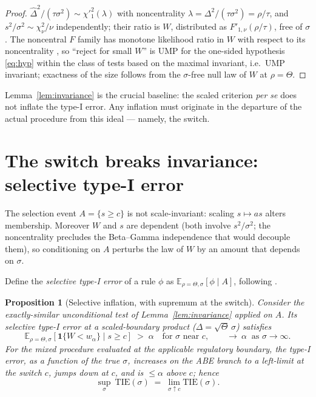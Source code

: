 \documentclass[11pt]{article}
\newtheorem{proposition}{Proposition}
\theoremstyle{remark}
\newcommand{\Dhat}{\hat{\Delta}}
\newcommand{\E}{\mathbb{E}}
\newcommand{\ind}{\mathbf{1}}
\begin{document}
\begin{proof}
$\Dhat^2/(\tau\sigma^2)\sim\chi'^2_1(\lambda)$ with noncentrality $\lambda=\Delta^2/(\tau\sigma^2)=\rho/\tau$, and $s^2/\sigma^2\sim\chi^2_\nu/\nu$ independently; their ratio is $W$, distributed as $F'_{1,\nu}(\rho/\tau)$, free of $\sigma$. The noncentral $F$ family has monotone likelihood ratio in $W$ with respect to its noncentrality \citep[Ch.~3]{lehmann2005}, so ``reject for small $W$'' is UMP for the one-sided hypothesis \eqref{eq:hyp} within the class of tests based on the maximal invariant, i.e.\ UMP invariant; exactness of the size follows from the $\sigma$-free null law of $W$ at $\rho=\Theta$.
\end{proof}

Lemma~\ref{lem:invariance} is the crucial baseline: the scaled criterion \emph{per se} does not inflate the type-I error. Any inflation must originate in the departure of the actual procedure from this ideal --- namely, the switch.

\section{The switch breaks invariance: selective type-I error}\label{sec:selective}

The selection event $A=\{s\ge c\}$ is not scale-invariant: scaling $s\mapsto as$ alters membership. Moreover $W$ and $s$ are dependent (both involve $s^2/\sigma^2$; the noncentrality precludes the Beta--Gamma independence that would decouple them), so conditioning on $A$ perturbs the law of $W$ by an amount that depends on $\sigma$.

Define the \emph{selective type-I error} of a rule $\phi$ as $\E_{\rho=\Theta,\sigma}[\phi\mid A]$, following \citet{fithian2014}.

\begin{proposition}[Selective inflation, with supremum at the switch]\label{prop:selective}
Consider the exactly-similar unconditional test of Lemma~\ref{lem:invariance} applied on $A$. Its selective type-I error at a scaled-boundary product ($\Delta=\sqrt{\Theta}\,\sigma$) satisfies
\begin{equation}
\E_{\rho=\Theta,\sigma}[\ind\{W<w_\alpha\}\mid s\ge c]\;>\;\alpha \quad\text{for } \sigma \text{ near } c,
\qquad \longrightarrow\ \alpha \ \text{ as } \sigma\to\infty .
\end{equation}
For the mixed procedure evaluated at the applicable regulatory boundary, the type-I error, as a function of the true $\sigma$, increases on the ABE branch to a left-limit at the switch $c$, jumps down at $c$, and is $\le\alpha$ above $c$; hence
\[
\sup_{\sigma}\ \mathrm{TIE}(\sigma) \;=\; \lim_{\sigma\uparrow c}\mathrm{TIE}(\sigma).
\]
\end{proposition}
\end{document}
